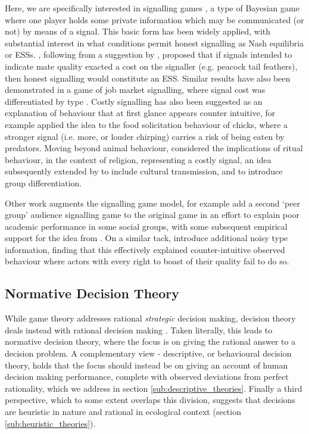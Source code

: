 Here, we are specifically interested in signalling games \citep{Spence1973,Kreps1987}, a type of Bayesian game where one player holds some private information which may be communicated (or not) by means of a signal.
This basic form has been widely applied, with substantial interest in what conditions permit honest signalling as Nash equilibria or \acp{ESS}. \citet{Grafen1990}, following from a suggestion by \citet{Zahavi1975}, proposed that if signals intended to indicate mate quality exacted a cost on the signaller (e.g. peacock tail feathers), then honest signalling would constitute an \ac{ESS}. Similar results have also been demonstrated in a game of job market signalling, where signal cost was differentiated by type \citep{Spence1973}. 
Costly signalling has also been suggested as an explanation of behaviour that at first glance appears counter intuitive, for example \citet{Godfray1991} applied the idea to the food solicitation behaviour of chicks, where a stronger signal (i.e. more, or louder chirping) carries a risk of being eaten by predators. Moving beyond animal behaviour, \citet{Sosis2003} considered the implications of ritual behaviour, in the context of religion, representing a costly signal, an idea subsequently extended by \citet{Henrich2009} to include cultural transmission, and \citet{Wildman2011} to introduce group differentiation.

Other work augments the signalling game model, for example \citet{Austen-Smith2005} add a second `peer group' audience signalling game to the original \citeauthor{Spence1973} game in an effort to explain poor academic performance in some social groups, with some subsequent empirical support for the idea from \citet{Jr2010}. On a similar tack, \citet{Feltovich2002} introduce additional noisy type information, finding that this effectively explained counter-intuitive observed behaviour where actors with every right to boast of their quality fail to do so.

\subsection{Normative Decision Theory}

While game theory addresses rational \emph{strategic} decision making, decision theory deals instead with rational decision making \citep{Peterson2009}.  Taken literally, this leads to normative decision theory, where the focus is on giving the rational answer to a decision problem. A complementary view - descriptive, or behavioural decision theory, holds that the focus should instead be on giving an account of human decision making performance, complete with observed deviations from perfect rationality, which we address in section \ref{sub:descriptive_theories}. Finally a third perspective, which to some extent overlaps this division, suggests that decisions are heuristic in nature and rational in ecological context \citep{Gigerenzer1996} (section \ref{sub:heuristic_theories}).

